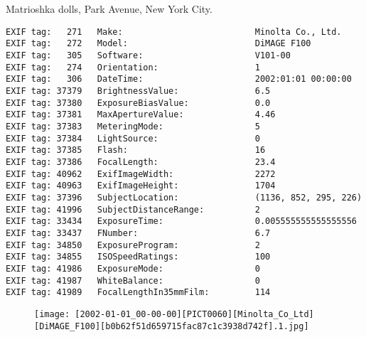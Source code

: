 \section{\protect{}}
\noindent Matrioshka dolls, Park Avenue, New York City.
\noindent
\begin{lstlisting}
EXIF tag:   271   Make:                          Minolta Co., Ltd.
EXIF tag:   272   Model:                         DiMAGE F100
EXIF tag:   305   Software:                      V101-00
EXIF tag:   274   Orientation:                   1
EXIF tag:   306   DateTime:                      2002:01:01 00:00:00
EXIF tag: 37379   BrightnessValue:               6.5
EXIF tag: 37380   ExposureBiasValue:             0.0
EXIF tag: 37381   MaxApertureValue:              4.46
EXIF tag: 37383   MeteringMode:                  5
EXIF tag: 37384   LightSource:                   0
EXIF tag: 37385   Flash:                         16
EXIF tag: 37386   FocalLength:                   23.4
EXIF tag: 40962   ExifImageWidth:                2272
EXIF tag: 40963   ExifImageHeight:               1704
EXIF tag: 37396   SubjectLocation:               (1136, 852, 295, 226)
EXIF tag: 41996   SubjectDistanceRange:          2
EXIF tag: 33434   ExposureTime:                  0.005555555555555556
EXIF tag: 33437   FNumber:                       6.7
EXIF tag: 34850   ExposureProgram:               2
EXIF tag: 34855   ISOSpeedRatings:               100
EXIF tag: 41986   ExposureMode:                  0
EXIF tag: 41987   WhiteBalance:                  0
EXIF tag: 41989   FocalLengthIn35mmFilm:         114

\end{lstlisting}
\clearpage
\begin{figure}
\raggedleft
\texttt{[image: [2002-01-01\_00-00-00][PICT0060][Minolta\_Co\_Ltd][DiMAGE\_F100][b0b62f51d659715fac87c1c3938d742f].1.jpg]}
\end{figure}


\clearpage
